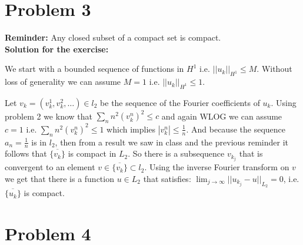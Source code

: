 \documentclass{article}
\begin{document}
\section{Problem 3}
\textbf{Reminder:} Any closed subset of a compact set is compact.\\
\textbf{Solution for the exercise:}

We start with a bounded sequence of functions in $H^1$ i.e. $||u_k||_{H^1}\leq M$.
Without loss of generality we can assume $M=1$ i.e. $||u_k||_{H^1}\leq 1$.

Let $v_k=(v_k^1,v_k^2,\dots)\in l_2$ be the sequence of the Fourier coefficients of $u_k$.
Using problem 2 we know that $\sum_nn^2(v_k^n)^2\leq c$ and again WLOG we can
assume $c=1$ i.e. $\sum_nn^2(v_k^n)^2\leq 1$ which implies $|v_k^n|\leq
\frac{1}{n}$. And because the sequence $a_n=\frac{1}{n}$ is in $l_2$, then from
a result we saw in class and the previous reminder it follows that
$\overline{\{v_k\}}$ is compact in $L_2$. So there is a subsequence $v_{k_j}$
that is convergent to an element $v\in \overline{\{v_k\}}\subset l_2$. Using
the inverse Fourier transform on $v$ we get that there is a function $u\in L_2$
that satisfies: $\lim_{j\to\infty}||u_{k_j}-u||_{L_2}=0$, i.e.
$\overline{\{u_k\}}$ is compact.
\section{Problem 4}
\end{document}
